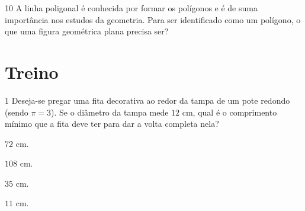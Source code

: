 

\num{10} A linha poligonal é conhecida por formar os polígonos e é de suma
importância nos estudos da geometria. Para ser identificado como um
polígono, o que uma figura geométrica plana precisa ser?


\section*{Treino}

\num{1}  Deseja-se pregar uma fita decorativa ao redor da tampa de um pote
redondo (sendo $\pi = 3$). Se o diâmetro da tampa mede $12$ cm, qual é o comprimento mínimo
que a fita deve ter para dar a volta completa nela?

\begin{escolha}
\item $72$ cm.
\item $108$ cm.
\item $35$ cm.
\item $11$ cm.
\end{escolha}



